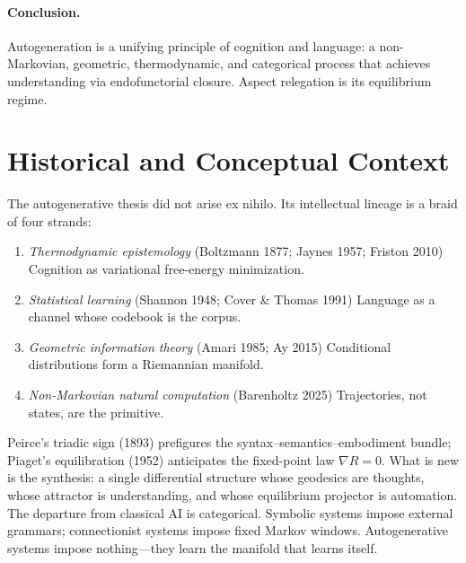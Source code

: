 \documentclass[12pt,a4paper,twoside,openright]{book}
\begin{document}
\paragraph{Conclusion.}
Autogeneration is a unifying principle of cognition and language: a non-Markovian, geometric, thermodynamic, and categorical process that achieves understanding via endofunctorial closure.
Aspect relegation is its equilibrium regime.

\section{Historical and Conceptual Context}
\label{sec:history}
The autogenerative thesis did not arise ex nihilo.
Its intellectual lineage is a braid of four strands:
\begin{enumerate}
\item \emph{Thermodynamic epistemology} (Boltzmann 1877; Jaynes 1957; Friston 2010)
   Cognition as variational free-energy minimization.
\item \emph{Statistical learning} (Shannon 1948; Cover \& Thomas 1991)
   Language as a channel whose codebook is the corpus.
\item \emph{Geometric information theory} (Amari 1985; Ay 2015)
   Conditional distributions form a Riemannian manifold.
\item \emph{Non-Markovian natural computation} (Barenholtz 2025)
   Trajectories, not states, are the primitive.
\end{enumerate}
Peirce’s triadic sign (1893) prefigures the syntax–semantics–embodiment bundle; Piaget’s equilibration (1952) anticipates the fixed-point law $\nabla R=0$.
What is new is the synthesis: a single differential structure whose geodesics are thoughts, whose attractor is understanding, and whose equilibrium projector is automation.
The departure from classical AI is categorical.
Symbolic systems impose external grammars; connectionist systems impose fixed Markov windows.
Autogenerative systems impose nothing—they learn the manifold that learns itself.
\end{document}
